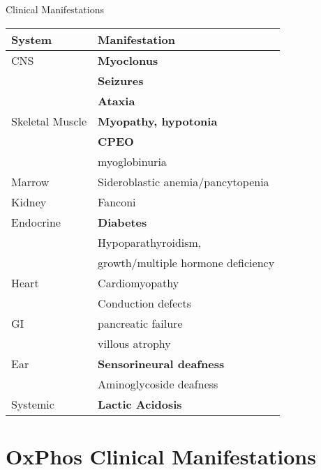 \documentclass[presentation, smaller]{beamer}
\begin{document}
\begin{frame}[label={sec:orgc3d91a2}]{Clinical Manifestations}
\begin{center}
\begin{tabular}{ll}
System & Manifestation\\
\hline
CNS & \textbf{Myoclonus}\\
 & \textbf{Seizures}\\
 & \textbf{Ataxia}\\
Skeletal Muscle & \textbf{Myopathy, hypotonia}\\
 & \textbf{CPEO}\\
 & myoglobinuria\\
Marrow & Sideroblastic anemia/pancytopenia\\
Kidney & Fanconi\\
Endocrine & \textbf{Diabetes}\\
 & Hypoparathyroidism,\\
 & growth/multiple hormone deficiency\\
Heart & Cardiomyopathy\\
 & Conduction defects\\
GI & pancreatic failure\\
 & villous atrophy\\
Ear & \textbf{Sensorineural deafness}\\
 & Aminoglycoside deafness\\
Systemic & \textbf{Lactic Acidosis}\\
\end{tabular}
\end{center}
\end{frame}


\section{OxPhos Clinical Manifestations}
\label{sec:org30c22c5}
\end{document}
